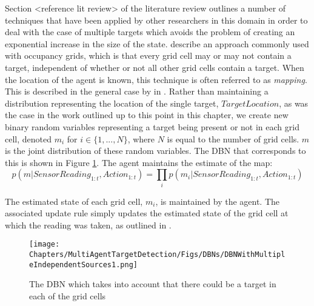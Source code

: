 Section <reference lit review> of the literature review outlines a number of techniques that have been applied by other researchers in this domain in order to deal with the case of multiple targets which avoids the problem of creating an exponential increase in the size of the state.  \citeauthor{Waharte2009CoordinatedUAVs} describe an approach commonly used with occupancy grids, which is that every grid cell may or may not contain a target, independent of whether or not all other grid cells contain a target. When the location of the agent is known, this technique is often referred to as \textit{mapping}. This is described in the general case by \citeauthor{Thrun:2005:ProbabilisticRobotics} in  \cite[P.~284]{Thrun:2005:ProbabilisticRobotics}. Rather than maintaining a distribution representing the location of the single target, $TargetLocation$, as was the case in the work outlined up to this point in this chapter, we create new binary random variables representing a target being present or not in each grid cell, denoted $m_i$ for $i \in \{1,...,N\}$, where $N$ is equal to the number of grid cells. $m$ is the joint distribution of these random variables. The DBN that corresponds to this is shown in Figure \ref{fig:DBNWithMultipleIndependent}. The agent maintains the estimate of the map: \[p(m | SensorReading_{1:t}, Action_{1:t}) = \prod\limits_{i}p(m_i | SensorReading_{1:t}, Action_{1:t})\]

The estimated state of each grid cell, $m_i$, is maintained by the agent. The associated update rule simply updates the estimated state of the grid cell at which the reading was taken, as outlined in \cite{Waharte2009CoordinatedUAVs}.

\begin{figure}
    \centering
    \texttt{[image: Chapters/MultiAgentTargetDetection/Figs/DBNs/DBNWithMultipleIndependentSources1.png]}
    \caption{The DBN which takes into account that there could be a target in each of the grid cells}
    \label{fig:DBNWithMultipleIndependent}
\end{figure}

